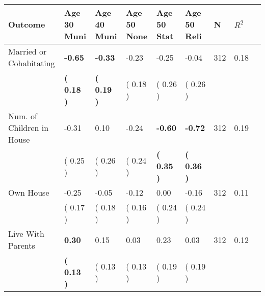 \begin{tabular}{L{6.2cm} C{1.8cm} C{1.8cm} C{1.8cm} C{1.8cm} C{1.8cm} C{1.8cm} C{0.3cm} C{0.3cm}}
\toprule
 \textbf{Outcome} & \textbf{Age 30 Muni} & \textbf{Age 40 Muni} & \textbf{Age 50 None} & \textbf{Age 50 Stat} & \textbf{Age 50 Reli} & \textbf{N} & \textbf{$ R^2$} \\
\midrule
Married or Cohabitating & \textbf{    -0.65} & \textbf{    -0.33} &     -0.23 &     -0.25 &     -0.04  & 312 &       0.18 \\ 
 & \textbf{(     0.18 )} & \textbf{(     0.19 )} & (     0.18 ) & (     0.26 ) & (     0.26 )  & \\
Num. of Children in House &     -0.31 &      0.10 &     -0.24 & \textbf{    -0.60} & \textbf{    -0.72}  & 312 &       0.19 \\ 
 & (     0.25 ) & (     0.26 ) & (     0.24 ) & \textbf{(     0.35 )} & \textbf{(     0.36 )}  & \\
Own House &     -0.25 &     -0.05 &     -0.12 &      0.00 &     -0.16  & 312 &       0.11 \\ 
 & (     0.17 ) & (     0.18 ) & (     0.16 ) & (     0.24 ) & (     0.24 )  & \\
Live With Parents & \textbf{     0.30} &      0.15 &      0.03 &      0.23 &      0.03  & 312 &       0.12 \\ 
 & \textbf{(     0.13 )} & (     0.13 ) & (     0.13 ) & (     0.19 ) & (     0.19 )  & \\
\bottomrule
\end{tabular}
